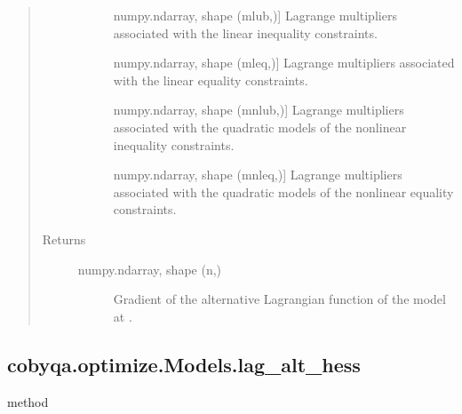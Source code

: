 \documentclass[letterpaper,10pt,english]{sphinxmanual}
\begin{document}
\begin{fulllineitems}
\begin{fulllineitems}
\begin{quote}
\begin{description}
\begin{description}
\item[{}] \leavevmode{[}numpy.ndarray, shape (mlub,){]}
\sphinxAtStartPar
Lagrange multipliers associated with the linear inequality
constraints.

\item[{}] \leavevmode{[}numpy.ndarray, shape (mleq,){]}
\sphinxAtStartPar
Lagrange multipliers associated with the linear equality
constraints.

\item[{}] \leavevmode{[}numpy.ndarray, shape (mnlub,){]}
\sphinxAtStartPar
Lagrange multipliers associated with the quadratic models of the
nonlinear inequality constraints.

\item[{}] \leavevmode{[}numpy.ndarray, shape (mnleq,){]}
\sphinxAtStartPar
Lagrange multipliers associated with the quadratic models of the
nonlinear equality constraints.

\end{description}

\item[{Returns}] \leavevmode\begin{description}
\item[{numpy.ndarray, shape (n,)}] \leavevmode
\sphinxAtStartPar
Gradient of the alternative Lagrangian function of the model at .

\end{description}

\end{description}\end{quote}

\end{fulllineitems}



\subsection{cobyqa.optimize.Models.lag\_alt\_hess}
\label{\detokenize{refs/generated/cobyqa.optimize.Models.lag_alt_hess:cobyqa-optimize-models-lag-alt-hess}}\label{\detokenize{refs/generated/cobyqa.optimize.Models.lag_alt_hess::doc}}
\sphinxAtStartPar
method


\end{fulllineitems}
\end{document}
